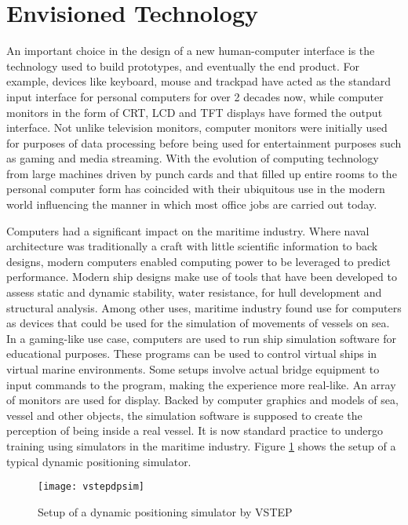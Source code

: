 \section{Envisioned Technology}
\label{sec:envisionedtech}
An important choice in the design of a new human-computer interface is the technology used to build prototypes, and eventually the end product. For example, devices like keyboard, mouse and trackpad have acted as the standard input interface for personal computers for over 2 decades now, while computer monitors in the form of CRT, LCD and TFT displays have formed the output interface. Not unlike television monitors, computer monitors were initially used for purposes of data processing before being used for entertainment purposes such as gaming and media streaming. With the evolution of computing technology from large machines driven by punch cards and that filled up entire rooms to the personal computer form has coincided with their ubiquitous use in the modern world influencing the manner in which most office jobs are carried out today. 

Computers had a significant impact on the maritime industry. Where naval architecture was traditionally a craft with little scientific information to back designs, modern computers enabled computing power to be leveraged to predict performance. Modern ship designs make use of tools that have been developed to assess static and dynamic stability, water resistance, for hull development and structural analysis. Among other uses, maritime industry found use for computers as devices that could be used for the simulation of movements of vessels on sea. In a gaming-like use case, computers are used to run ship simulation software for educational purposes. These programs can be used to control virtual ships in virtual marine environments. Some setups involve actual bridge equipment to input commands to the program, making the experience more real-like. An array of monitors are used for display. Backed by computer graphics and models of sea, vessel and other objects, the simulation software is supposed to create the perception of being inside a real vessel. It is now standard practice to undergo training using simulators in the maritime industry. Figure \ref{fig:vstepdpsim} shows the setup of a typical dynamic positioning simulator. 


\begin{figure}
	\centering
	\texttt{[image: vstepdpsim]}
	\caption{Setup of a dynamic positioning simulator by VSTEP}
	\label{fig:vstepdpsim}
\end{figure}


